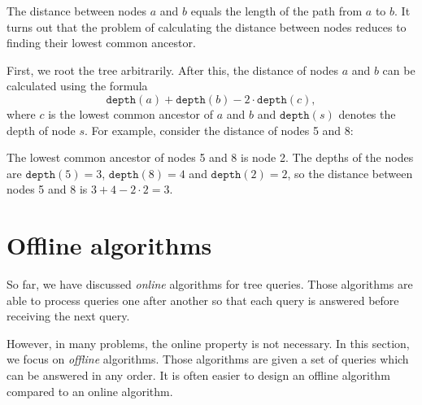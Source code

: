 The distance between nodes $a$ and $b$
equals the length of the path from $a$ to $b$.
It turns out that the problem of calculating
the distance between nodes reduces to
finding their lowest common ancestor.

First, we root the tree arbitrarily.
After this, the distance of nodes $a$ and $b$
can be calculated using the formula
\[\texttt{depth}(a)+\texttt{depth}(b)-2 \cdot \texttt{depth}(c),\]
where $c$ is the lowest common ancestor of $a$ and $b$
and $\texttt{depth}(s)$ denotes the depth of node $s$.
For example, consider the distance of nodes 5 and 8:
\begin{center}
\end{center}

The lowest common ancestor of nodes 5 and 8 is node 2.
The depths of the nodes are
$\texttt{depth}(5)=3$, $\texttt{depth}(8)=4$ and $\texttt{depth}(2)=2$,
so the distance between nodes 5 and 8 is
$3+4-2\cdot2=3$.

\section{Offline algorithms}

So far, we have discussed \emph{online} algorithms
for tree queries.
Those algorithms are able to process
queries one after another so that
each query is answered before receiving the next query.

However, in many problems, the online
property is not necessary.
In this section, we focus on \emph{offline} algorithms.
Those algorithms are given a set of queries which can
be answered in any order.
It is often easier to design an offline algorithm
compared to an online algorithm.

